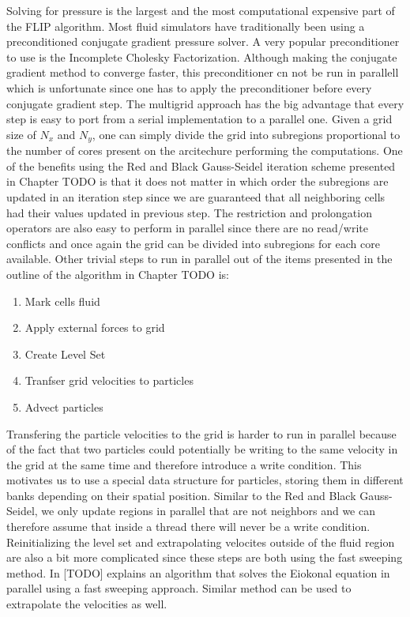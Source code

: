 Solving for pressure is the largest and the most computational expensive part of the FLIP algorithm. Most fluid simulators have traditionally been using a preconditioned conjugate gradient pressure solver. A very popular preconditioner to use is the Incomplete Cholesky Factorization. Although making the conjugate gradient method to converge faster, this preconditioner cn not be run in parallell which is unfortunate since one has to apply the preconditioner before every conjugate gradient step. The multigrid approach has the big advantage that every step is easy to port from a serial implementation to a parallel one. Given a grid size of $N_x$ and $N_y$, one can simply divide the grid into subregions proportional to the number of cores present on the arcitechure performing the computations. One of the benefits using the Red and Black Gauss-Seidel iteration scheme presented in Chapter TODO is that it does not matter in which order the subregions are updated in an iteration step since we are guaranteed that all neighboring cells had their values updated in previous step. The restriction and prolongation operators are also easy to perform in parallel since there are no read/write conflicts and once again the grid can be divided into subregions for each core available. Other trivial steps to run in parallel out of the items presented in the outline of the algorithm in Chapter TODO is:

\begin{enumerate}
\item Mark cells fluid
\item Apply external forces to grid
\item Create Level Set
\item Tranfser grid velocities to particles
\item Advect particles
\end{enumerate}

Transfering the particle velocities to the grid is harder to run in parallel because of the fact that two particles could potentially be writing to the same velocity in the grid at the same time and therefore introduce a write condition. This motivates us to use a special data structure for particles, storing them in different banks depending on their spatial position. Similar to the Red and Black Gauss-Seidel, we only update regions in parallel that are not neighbors and we can therefore assume that inside a thread there will never be a write condition.
\newline
\newline
Reinitializing the level set and extrapolating velocites outside of the fluid region are also a bit more complicated since these steps are both using the fast sweeping method. In [TODO] explains an algorithm that solves the Eiokonal equation in parallel using a fast sweeping approach. Similar method can be used to extrapolate the velocities as well.
